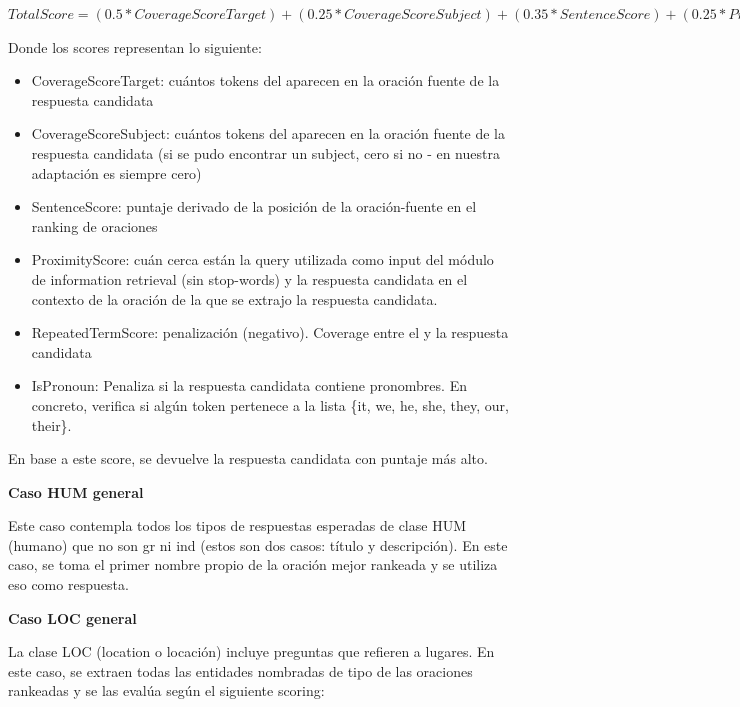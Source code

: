 $TotalScore = (0.5 * CoverageScoreTarget)+ (0.25 * CoverageScoreSubject) + (0.35 * SentenceScore) +
					 (0.25 * ProximityScore)	+ (0.1 * RepeatedTermScore) + (0.5 * IsPronoun)$\newline

Donde los scores representan lo siguiente:
\begin{itemize}
  \item CoverageScoreTarget: cuántos tokens del  aparecen en la oración fuente de la respuesta candidata
  \item CoverageScoreSubject: cuántos tokens del  aparecen en la oración fuente de la respuesta candidata (si se pudo encontrar un subject, cero si no - en nuestra adaptación es siempre cero)
  \item SentenceScore: puntaje derivado de la posición de la oración-fuente en el ranking de oraciones
  \item ProximityScore: cuán cerca están la query utilizada como input del módulo de information retrieval (sin stop-words) y la respuesta candidata en el contexto de la oración de la que se extrajo la respuesta candidata.
  \item RepeatedTermScore: penalización (negativo). Coverage entre el  y la respuesta candidata
  \item IsPronoun: Penaliza si la respuesta candidata contiene pronombres. En concreto, verifica si algún token pertenece a la lista \{it, we, he, she, they, our, their\}.
\end{itemize}

En base a este score, se devuelve la respuesta candidata con puntaje más alto. \newline

\textbf{Caso HUM general} \newline

Este caso contempla todos los tipos de respuestas esperadas de clase HUM (humano) que no son gr ni ind (estos son dos casos: título y descripción). En este caso, se toma el primer nombre propio de la oración mejor rankeada y se utiliza eso como respuesta. \newline

\textbf{Caso LOC general} \newline

La clase LOC (location o locación) incluye preguntas que refieren a lugares.  En este caso, se extraen todas las entidades nombradas de tipo  de las oraciones rankeadas y se las evalúa según el siguiente scoring:

